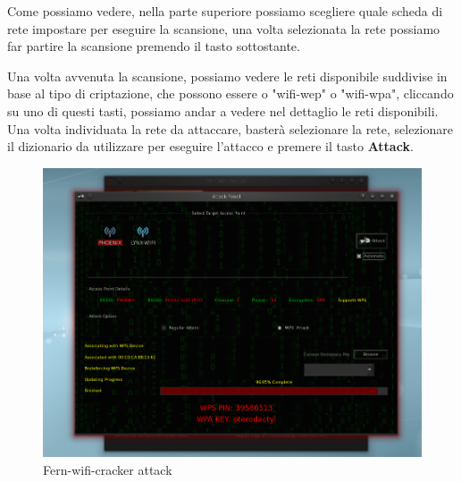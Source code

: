 Come possiamo vedere, nella parte superiore possiamo scegliere quale scheda di rete impostare per eseguire la scansione, una volta selezionata la rete possiamo far partire la scansione premendo il tasto sottostante.
\newpage

Una volta avvenuta la scansione, possiamo vedere le reti disponibile suddivise in base al tipo di criptazione, che possono essere o "wifi-wep" o "wifi-wpa", cliccando su uno di questi tasti, possiamo andar a vedere nel dettaglio le reti disponibili. Una volta individuata la rete da attaccare, basterà selezionare la rete, selezionare il dizionario da utilizzare per eseguire l'attacco e premere il tasto \textbf{Attack}.

\begin{figure}[ht]
    \centering
    \includegraphics[width=\linewidth]{Immagini/6/fern_3.jpg}
    \caption{Fern-wifi-cracker attack}
    \label{fig:Fern esempio}
\end{figure}

\label{chap:conc}
